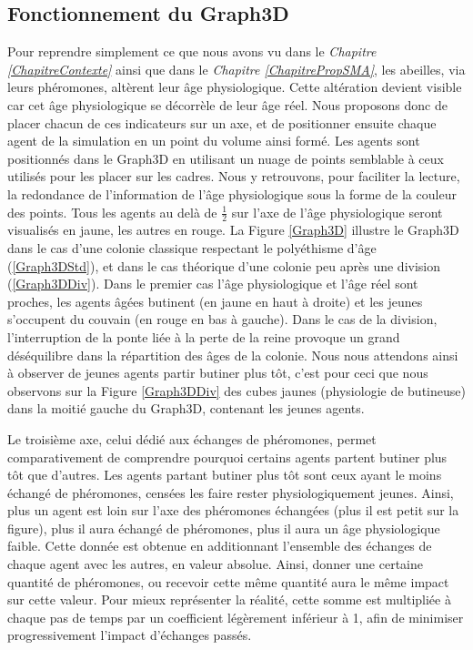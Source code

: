 		\subsection{Fonctionnement du Graph3D}
		
		Pour reprendre simplement ce que nous avons vu dans le \textit{Chapitre \ref{ChapitreContexte}} ainsi que dans le \textit{Chapitre \ref{ChapitrePropSMA}}, les abeilles, via leurs phéromones, altèrent leur âge physiologique. Cette altération devient visible car cet âge physiologique se décorrèle de leur âge réel. Nous proposons donc de placer chacun de ces indicateurs sur un axe, et de positionner ensuite chaque agent de la simulation en un point du volume ainsi formé. Les agents sont positionnés dans le Graph3D en utilisant un nuage de points semblable à ceux utilisés pour les placer sur les cadres. Nous y retrouvons, pour faciliter la lecture, la redondance de l'information de l'âge physiologique sous la forme de la couleur des points. Tous les agents au delà de $\frac{1}{2}$ sur l'axe de l'âge physiologique seront visualisés en jaune, les autres en rouge.
		La Figure \ref{Graph3D} illustre le Graph3D dans le cas d'une colonie classique respectant le polyéthisme d'âge (\ref{Graph3DStd}), et dans le cas théorique d'une colonie peu après une division (\ref{Graph3DDiv}). Dans le premier cas l'âge physiologique et l'âge réel sont proches, les agents âgées butinent (en jaune en haut à droite) et les jeunes s'occupent du couvain (en rouge en bas à gauche). Dans le cas de la division, l'interruption de la ponte liée à la perte de la reine provoque un grand déséquilibre dans la répartition des âges de la colonie. Nous nous attendons ainsi à observer de jeunes agents partir butiner plus tôt, c'est pour ceci que nous observons sur la Figure \ref{Graph3DDiv} des cubes jaunes (physiologie de butineuse) dans la moitié gauche du Graph3D, contenant les jeunes agents.
		
		Le troisième axe, celui dédié aux échanges de phéromones, permet comparativement de comprendre pourquoi certains agents partent butiner plus tôt que d'autres. Les agents partant butiner plus tôt sont ceux ayant le moins échangé de phéromones, censées les faire rester physiologiquement jeunes. Ainsi, plus un agent est loin sur l'axe des phéromones échangées (plus il est petit sur la figure), plus il aura échangé de phéromones, plus il aura un âge physiologique faible. Cette donnée est obtenue en additionnant l'ensemble des échanges de chaque agent avec les autres, en valeur absolue. Ainsi, donner une certaine quantité de phéromones, ou recevoir cette même quantité aura le même impact sur cette valeur. Pour mieux représenter la réalité, cette somme est multipliée à chaque pas de temps par un coefficient légèrement inférieur à 1, afin de minimiser progressivement l'impact d'échanges passés.
		

